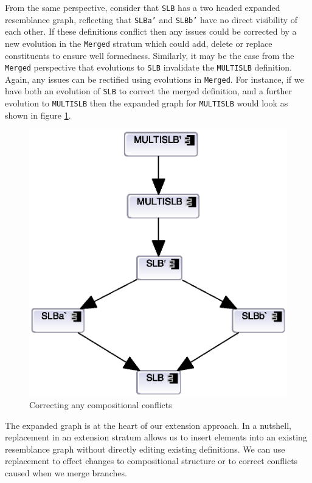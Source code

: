 From the same perspective, consider that \texttt{SLB} has a two headed
expanded resemblance graph, reflecting that \texttt{SLBa\textquoteright{}}
and \texttt{SLBb\textquoteright{}} have no direct visibility of each
other. If these definitions conflict then any issues could be corrected
by a new evolution in the \texttt{Merged} stratum which could add,
delete or replace constituents to ensure well formedness. Similarly,
it may be the case from the \texttt{Merged} perspective that evolutions
to \texttt{SLB} invalidate the \texttt{MULTISLB} definition. Again,
any issues can be rectified using evolutions in \texttt{Merged}. For
instance, if we have both an evolution of \texttt{SLB} to correct
the merged definition, and a further evolution to \texttt{MULTISLB}
then the expanded graph for \texttt{MULTISLB} would look as shown
in figure \ref{fig:Correcting-any-compositional}.

\begin{figure}[h]
\noindent \begin{centering}
\includegraphics[width=0.6\columnwidth]{images/formal-corrected}
\par\end{centering}

\protect\caption{\label{fig:Correcting-any-compositional}Correcting any compositional
conflicts}


\end{figure}


The expanded graph is at the heart of our extension approach. In a
nutshell, replacement in an extension stratum allows us to insert
elements into an existing resemblance graph without directly editing
existing definitions. We can use replacement to effect changes to
compositional structure or to correct conflicts caused when we merge
branches.

